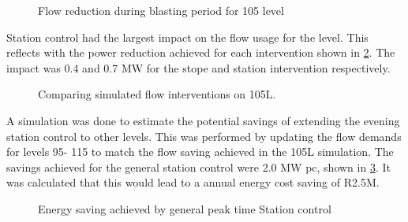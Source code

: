 	\begin{figure}[h!]
		\centering
		
		\caption{Flow reduction during blasting period for 105 level}
		\label{fig: 105 Flow savings}
	\end{figure}
Station control had the largest impact on the flow usage for the level. This reflects with the power reduction achieved for each intervention shown in \cref{fig: Station vs stope}. The impact was 0.4 and 0.7 MW for the stope and station intervention respectively.
	
	\begin{figure}[h!]
		\centering
		
		\caption{Comparing simulated flow interventions on 105L.}
		\label{fig: Station vs stope}
	\end{figure}
A simulation was done to estimate the potential savings of extending the evening station control to other levels. This was performed by updating the flow demands for levels 95- 115 to match the flow saving achieved in the 105L simulation. The savings achieved for the general station control were 2.0 MW \gls{pc}, shown in \cref{fig: General station optimise}. It was calculated that this would lead to a annual energy cost saving of R2.5M.
\begin{figure}[h!]
	\centering
	
	\caption{Energy saving achieved by general peak time Station control }
	\label{fig: General station optimise}
\end{figure}
\clearpage
